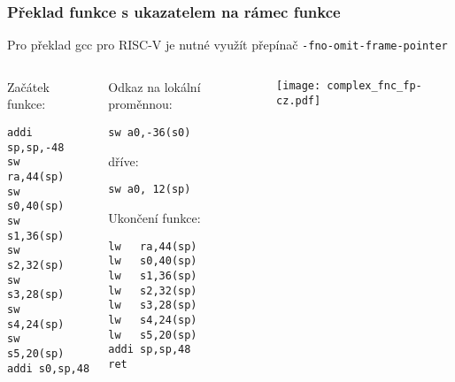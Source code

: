 \documentclass{beamer}
\begin{document}
\begin{frame}[fragile,shrink=5]
\frametitle{Překlad funkce s ukazatelem na rámec funkce}

Pro překlad gcc pro RISC-V je nutné využít přepínač \texttt{-fno-omit-frame-pointer}
\begin{columns}
\begin{column}{0.25\textwidth}
Začátek funkce:

\begin{verbatim}
addi sp,sp,-48
sw   ra,44(sp)
sw   s0,40(sp)
sw   s1,36(sp)
sw   s2,32(sp)
sw   s3,28(sp)
sw   s4,24(sp)
sw   s5,20(sp)
addi s0,sp,48
\end{verbatim}
\end{column}   
\begin{column}{0.4\textwidth}
Odkaz na lokální proměnnou:

\begin{verbatim}
sw a0,-36(s0)
\end{verbatim}
dříve:
\begin{verbatim}
sw a0, 12(sp)
\end{verbatim}



Ukončení funkce:

\begin{verbatim}
lw   ra,44(sp)
lw   s0,40(sp)
lw   s1,36(sp)
lw   s2,32(sp)
lw   s3,28(sp)
lw   s4,24(sp)
lw   s5,20(sp)
addi sp,sp,48
ret
\end{verbatim}
\end{column}
\begin{column}{0.35\textwidth}  
\texttt{[image: complex\_fnc\_fp-cz.pdf]}
\end{column}
\end{columns}
\end{frame}
\end{document}
